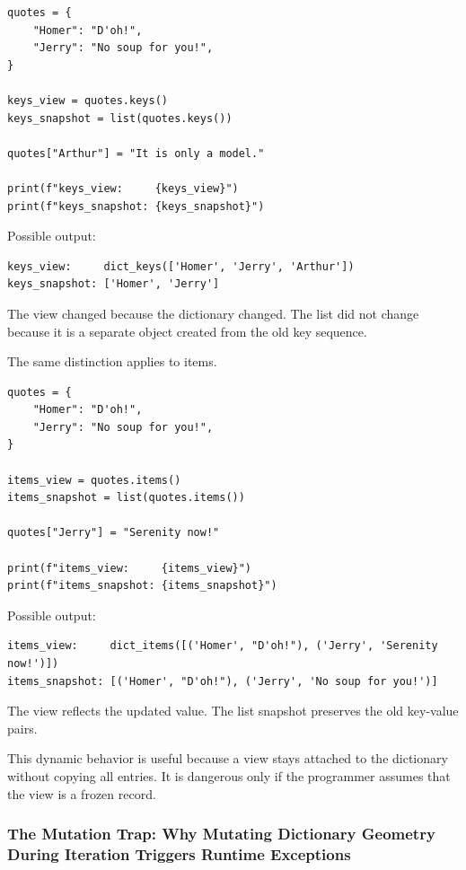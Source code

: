 \begin{verbatim}
quotes = {
    "Homer": "D'oh!",
    "Jerry": "No soup for you!",
}

keys_view = quotes.keys()
keys_snapshot = list(quotes.keys())

quotes["Arthur"] = "It is only a model."

print(f"keys_view:     {keys_view}")
print(f"keys_snapshot: {keys_snapshot}")
\end{verbatim}

Possible output:

\begin{verbatim}
keys_view:     dict_keys(['Homer', 'Jerry', 'Arthur'])
keys_snapshot: ['Homer', 'Jerry']
\end{verbatim}

The view changed because the dictionary changed. The list did not change because it is a separate object created from the old key sequence.

The same distinction applies to items.

\begin{verbatim}
quotes = {
    "Homer": "D'oh!",
    "Jerry": "No soup for you!",
}

items_view = quotes.items()
items_snapshot = list(quotes.items())

quotes["Jerry"] = "Serenity now!"

print(f"items_view:     {items_view}")
print(f"items_snapshot: {items_snapshot}")
\end{verbatim}

Possible output:

\begin{verbatim}
items_view:     dict_items([('Homer', "D'oh!"), ('Jerry', 'Serenity now!')])
items_snapshot: [('Homer', "D'oh!"), ('Jerry', 'No soup for you!')]
\end{verbatim}

The view reflects the updated value. The list snapshot preserves the old key-value pairs.

This dynamic behavior is useful because a view stays attached to the dictionary without copying all entries. It is dangerous only if the programmer assumes that the view is a frozen record.

\subsubsection{The Mutation Trap: Why Mutating Dictionary Geometry During Iteration Triggers Runtime Exceptions}

